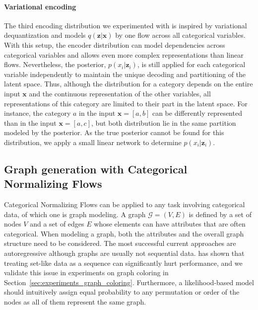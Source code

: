 \paragraph{Variational encoding}
The third encoding distribution we experimented with is inspired by variational dequantization \cite{Flow++} and models $q(\bm{z}|\bm{x})$ by one flow across all categorical variables.
With this setup, the encoder distribution can model dependencies across categorical variables and allows even more complex representations than linear flows.
Nevertheless, the posterior, $p(x_i|\bm{z}_i)$, is still applied for each categorical variable independently to maintain the unique decoding and partitioning of the latent space. 
Thus, although the distribution for a category depends on the entire input $\bm{x}$ and the continuous representation of the other variables, all representations of this category are limited to their part in the latent space.
For instance, the category $a$ in the input $\bm{x}=[a,b]$ can be differently represented than in the input $\bm{x}=[a,c]$, but both distribution lie in the same partition modeled by the posterior. 
As the true posterior cannot be found for this distribution, we apply a small linear network to determine $p(x_i|\bm{z}_i)$. 


\subsection{Graph generation with Categorical Normalizing Flows}
\label{sec:methodology_GraphCNF}
Categorical Normalizing Flows can be applied to any task involving categorical data, of which one is graph modeling.
A graph $\mathcal{G}=(V,E)$ is defined by a set of nodes $V$ and a set of edges $E$ whose elements can have attributes that are often categorical. 
When modeling a graph, both the attributes and the overall graph structure need to be considered.
The most successful current approaches \cite{GraphRNNAttention, MolecularRNN, GraphAF, GraphRNN} are autoregressive although graphs are usually not sequential data. \citet{OrderMatters} has shown that treating set-like data as a sequence can significantly hurt performance, and we validate this issue in experiments on graph coloring in Section~\ref{sec:experiments_graph_coloring}. 
Furthermore, a likelihood-based model should intuitively assign equal probability to any permutation or order of the nodes as all of them represent the same graph.

